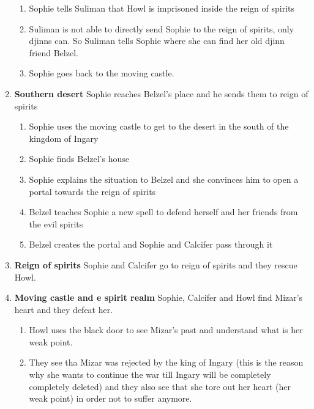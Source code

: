 \begin{enumerate}
\begin{enumerate}
		\item Sophie tells Suliman that Howl is imprisoned inside the reign of spirits
	
		\item Suliman is not able to directly send Sophie to the reign of spirits, only djinns can. So Suliman tells Sophie where she can find her old djinn friend Belzel.
	
		\item Sophie goes back to the moving castle.
	\end{enumerate}

	\item \textbf{Southern desert} Sophie reaches Belzel’s place and he sends them to reign of spirits

	\begin{enumerate}
		\item Sophie uses the moving castle to get to the desert in the south of the kingdom of Ingary
	
		\item Sophie finds Belzel’s house
	
		\item Sophie explains the situation to Belzel and she convinces him to open a portal towards the reign of spirits
	
		\item Belzel teaches Sophie a new spell to defend herself and her friends from the evil spirits
	
		\item Belzel creates the portal and Sophie and Calcifer pass through it
	\end{enumerate}

	\item \textbf{Reign of spirits} Sophie and Calcifer go to reign of spirits and they rescue Howl.

	\item \textbf{Moving castle and e spirit realm}  Sophie, Calcifer and Howl find Mizar’s heart and they defeat her.

	\begin{enumerate}
		\item Howl uses the black door to see Mizar’s past and understand what is her weak point.
	
		\item They see tha Mizar was rejected by the king of Ingary (this is the reason why she wants to continue the war till Ingary will be completely completely deleted) and they also see that she tore out her heart (her weak point) in order not to suffer anymore.
	

\end{enumerate}
\end{enumerate}
